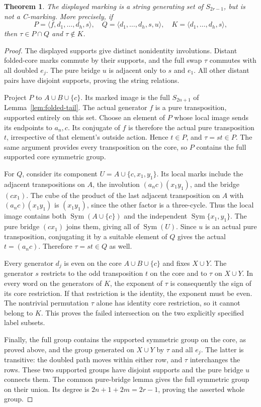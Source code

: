 \documentclass[a4paper,11pt]{article}
\newcommand{\Sym}{\operatorname{Sym}}\newcommand{\gen}[1]{\langle #1\rangle}
\newtheorem{theorem}{Theorem}\newtheorem{lemma}[theorem]{Lemma}\newtheorem{corollary}[theorem]{Corollary}
\begin{document}
\begin{theorem}\label{thm:counter}
The displayed marking is a string generating set of $S_{2r-1}$, but is not
a C-marking. More precisely, if
\[
 P=\gen{f,d_1,\ldots,d_h,s},\quad
 Q=\gen{d_1,\ldots,d_h,s,u},\quad
 K=\gen{d_1,\ldots,d_h,s},
\]
then $\tau\in P\cap Q$ and $\tau\notin K$.
\end{theorem}
\begin{proof}
The displayed supports give distinct nonidentity involutions. Distant folded-core marks commute by their
supports, and the full swap $\tau$ commutes with all doubled $e_j$.
The pure bridge $u$ is adjacent only to $s$ and $e_1$. All other distant
pairs have disjoint supports, proving the string relations.

Project $P$ to $A\cup B\cup\{c\}$. Its marked image is the full
$S_{2n+1}$ of Lemma~\ref{lem:folded-tail}. The actual generator $f$ is a pure
transposition, supported entirely on this set. Choose an element of $P$
whose local image sends its endpoints to $a_n,c$. Its conjugate of $f$ is
therefore the actual pure transposition $t$, irrespective of that element's
outside action. Hence $t\in P$, and $\tau=st\in P$.
The same argument provides every transposition on the core, so $P$ contains
the full supported core symmetric group.

For $Q$, consider its component
$U=A\cup\{c,x_1,y_1\}$. Its local marks include the adjacent transpositions
on $A$, the involution $(a_nc)(x_1y_1)$, and the bridge $(cx_1)$.
The cube of the product of the last adjacent transposition on $A$ with
$(a_nc)(x_1y_1)$ is $(x_1y_1)$, since the other factor is a three-cycle.
Thus the local image contains both $\Sym(A\cup\{c\})$ and the independent
$\Sym\{x_1,y_1\}$. The pure bridge $(cx_1)$ joins them, giving all of
$\Sym(U)$. Since $u$ is an actual pure transposition, conjugating it by a
suitable element of $Q$ gives the actual $t=(a_nc)$. Therefore
$\tau=st\in Q$ as well.

Every generator $d_j$ is even on the core $A\cup B\cup\{c\}$ and fixes
$X\cup Y$. The generator $s$ restricts to the odd transposition $t$ on the
core and to $\tau$ on $X\cup Y$. In every word on the generators of $K$,
the exponent of $\tau$ is consequently the sign of its core restriction.
If that restriction is the identity, the exponent must be even. The nontrivial
permutation $\tau$ alone has identity core restriction, so it cannot belong
to $K$. This proves the failed intersection on the two explicitly specified
label subsets.

Finally, the full group contains the supported symmetric group on the core,
as proved above, and the group generated on $X\cup Y$ by $\tau$ and all
$e_j$. The latter is transitive: the doubled path moves within either row,
and $\tau$ interchanges the rows. These two supported groups have disjoint
supports and the pure bridge $u$ connects them. The common pure-bridge lemma
gives the full symmetric group on their union. Its degree is
$2n+1+2m=2r-1$, proving the asserted whole group.
\end{proof}
\end{document}
